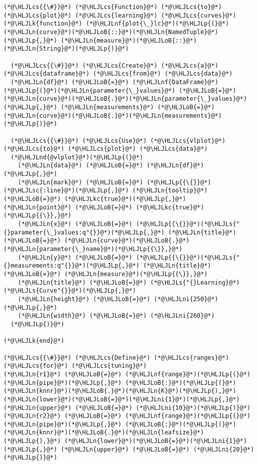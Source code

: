\documentclass[12pt,a4paper]{article}
\newcommand{\HLJLk}[1]{\textcolor[RGB]{148,91,176}{\textbf{#1}}}
\newcommand{\HLJLkc}[1]{\textcolor[RGB]{59,151,46}{\textit{#1}}}
\newcommand{\HLJLn}[1]{#1}
\newcommand{\HLJLnd}[1]{\textcolor[RGB]{214,102,97}{#1}}
\newcommand{\HLJLnf}[1]{\textcolor[RGB]{66,102,213}{#1}}
\newcommand{\HLJLs}[1]{\textcolor[RGB]{201,61,57}{#1}}
\newcommand{\HLJLsc}[1]{\textcolor[RGB]{201,61,57}{#1}}
\newcommand{\HLJLni}[1]{\textcolor[RGB]{59,151,46}{#1}}
\newcommand{\HLJLoB}[1]{\textcolor[RGB]{102,102,102}{\textbf{#1}}}
\newcommand{\HLJLp}[1]{#1}
\newcommand{\HLJLcs}[1]{\textcolor[RGB]{153,153,119}{\textit{#1}}}
\begin{document}
\begin{lstlisting}
(*@\HLJLcs{{\#}}@*) (*@\HLJLcs{Function}@*) (*@\HLJLcs{to}@*) (*@\HLJLcs{plot}@*) (*@\HLJLcs{learning}@*) (*@\HLJLcs{curves}@*)
(*@\HLJLk{function}@*) (*@\HLJLnf{plot{\_}lc}@*)(*@\HLJLp{(}@*)(*@\HLJLn{curve}@*)(*@\HLJLoB{::}@*)(*@\HLJLn{NamedTuple}@*)(*@\HLJLp{,}@*) (*@\HLJLn{measure}@*)(*@\HLJLoB{::}@*)(*@\HLJLn{String}@*)(*@\HLJLp{)}@*)
  
  (*@\HLJLcs{{\#}}@*) (*@\HLJLcs{Create}@*) (*@\HLJLcs{a}@*) (*@\HLJLcs{dataframe}@*) (*@\HLJLcs{from}@*) (*@\HLJLcs{data}@*)
  (*@\HLJLn{df}@*) (*@\HLJLoB{=}@*) (*@\HLJLnf{DataFrame}@*)(*@\HLJLp{(}@*)(*@\HLJLn{parameter{\_}values}@*) (*@\HLJLoB{=}@*) (*@\HLJLn{curve}@*)(*@\HLJLoB{.}@*)(*@\HLJLn{parameter{\_}values}@*)(*@\HLJLp{,}@*) (*@\HLJLn{measurements}@*) (*@\HLJLoB{=}@*) (*@\HLJLn{curve}@*)(*@\HLJLoB{.}@*)(*@\HLJLn{measurements}@*)(*@\HLJLp{)}@*)
  
  (*@\HLJLcs{{\#}}@*) (*@\HLJLcs{Use}@*) (*@\HLJLcs{vlplot}@*) (*@\HLJLcs{to}@*) (*@\HLJLcs{plot}@*) (*@\HLJLcs{data}@*)  
  (*@\HLJLnd{@vlplot}@*)(*@\HLJLp{(}@*)
    (*@\HLJLn{data}@*) (*@\HLJLoB{=}@*) (*@\HLJLn{df}@*)(*@\HLJLp{,}@*)
    (*@\HLJLn{mark}@*) (*@\HLJLoB{=}@*) (*@\HLJLp{{\{}}@*)(*@\HLJLsc{:line}@*)(*@\HLJLp{,}@*) (*@\HLJLn{tooltip}@*) (*@\HLJLoB{=}@*) (*@\HLJLkc{true}@*)(*@\HLJLp{,}@*) (*@\HLJLn{point}@*) (*@\HLJLoB{=}@*) (*@\HLJLkc{true}@*)(*@\HLJLp{{\}},}@*)
    (*@\HLJLn{x}@*) (*@\HLJLoB{=}@*) (*@\HLJLp{{\{}}@*)(*@\HLJLs{"{}parameter{\_}values:q"{}}@*)(*@\HLJLp{,}@*) (*@\HLJLn{title}@*) (*@\HLJLoB{=}@*) (*@\HLJLn{curve}@*)(*@\HLJLoB{.}@*)(*@\HLJLn{parameter{\_}name}@*)(*@\HLJLp{{\}},}@*)
    (*@\HLJLn{y}@*) (*@\HLJLoB{=}@*) (*@\HLJLp{{\{}}@*)(*@\HLJLs{"{}measurements:q"{}}@*)(*@\HLJLp{,}@*) (*@\HLJLn{title}@*) (*@\HLJLoB{=}@*) (*@\HLJLn{measure}@*)(*@\HLJLp{{\}},}@*)
    (*@\HLJLn{title}@*) (*@\HLJLoB{=}@*) (*@\HLJLs{"{}Learning}@*) (*@\HLJLs{Curve"{}}@*)(*@\HLJLp{,}@*)
    (*@\HLJLn{height}@*) (*@\HLJLoB{=}@*) (*@\HLJLni{250}@*)(*@\HLJLp{,}@*)
    (*@\HLJLn{width}@*) (*@\HLJLoB{=}@*) (*@\HLJLni{260}@*)
  (*@\HLJLp{)}@*)  

(*@\HLJLk{end}@*)

(*@\HLJLcs{{\#}}@*) (*@\HLJLcs{Define}@*) (*@\HLJLcs{ranges}@*) (*@\HLJLcs{for}@*) (*@\HLJLcs{tuning}@*)
(*@\HLJLn{r1}@*) (*@\HLJLoB{=}@*) (*@\HLJLnf{range}@*)(*@\HLJLp{(}@*)(*@\HLJLn{pipe}@*)(*@\HLJLp{,}@*) (*@\HLJLoB{:}@*)(*@\HLJLp{(}@*)(*@\HLJLn{knnr}@*)(*@\HLJLoB{.}@*)(*@\HLJLn{K}@*)(*@\HLJLp{),}@*) (*@\HLJLn{lower}@*)(*@\HLJLoB{=}@*)(*@\HLJLni{1}@*)(*@\HLJLp{,}@*) (*@\HLJLn{upper}@*) (*@\HLJLoB{=}@*) (*@\HLJLni{10}@*)(*@\HLJLp{)}@*) 
(*@\HLJLn{r2}@*) (*@\HLJLoB{=}@*) (*@\HLJLnf{range}@*)(*@\HLJLp{(}@*)(*@\HLJLn{pipe}@*)(*@\HLJLp{,}@*) (*@\HLJLoB{:}@*)(*@\HLJLp{(}@*)(*@\HLJLn{knnr}@*)(*@\HLJLoB{.}@*)(*@\HLJLn{leafsize}@*)(*@\HLJLp{),}@*) (*@\HLJLn{lower}@*)(*@\HLJLoB{=}@*)(*@\HLJLni{1}@*)(*@\HLJLp{,}@*) (*@\HLJLn{upper}@*) (*@\HLJLoB{=}@*) (*@\HLJLni{20}@*)(*@\HLJLp{)}@*) 


\end{lstlisting}
\end{document}
